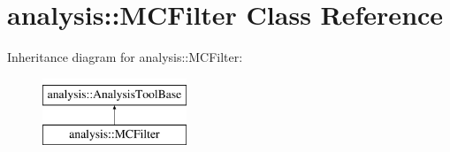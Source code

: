 \hypertarget{classanalysis_1_1MCFilter}{}\section{analysis\+:\+:M\+C\+Filter Class Reference}
\label{classanalysis_1_1MCFilter}
Inheritance diagram for analysis\+:\+:M\+C\+Filter\+:\begin{figure}[H]
\begin{center}
\leavevmode
\includegraphics[height=2.000000cm]{classanalysis_1_1MCFilter}
\end{center}
\end{figure}
